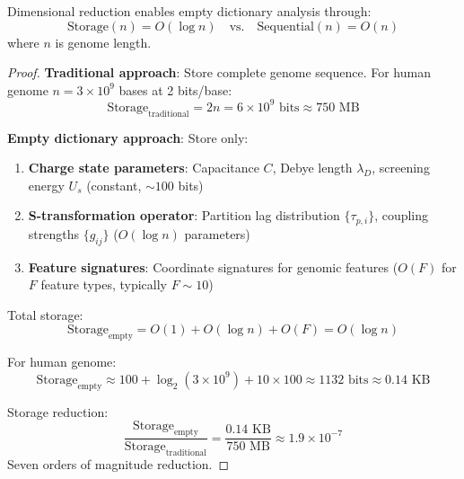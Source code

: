 \begin{theorem}
\label{thm:empty_dictionary_feasibility}
Dimensional reduction enables empty dictionary analysis through:
\begin{equation}
\text{Storage}(n) = O(\log n) \quad \text{vs.} \quad \text{Sequential}(n) = O(n)
\end{equation}
where $n$ is genome length.
\end{theorem}

\begin{proof}
\textbf{Traditional approach}: Store complete genome sequence. For human genome $n = 3 \times 10^9$ bases at 2 bits/base:
\begin{equation}
\text{Storage}_{\text{traditional}} = 2n = 6 \times 10^9 \text{ bits} \approx 750 \text{ MB}
\end{equation}

\textbf{Empty dictionary approach}: Store only:
\begin{enumerate}
\item \textbf{Charge state parameters}: Capacitance $C$, Debye length $\lambda_D$, screening energy $U_s$ (constant, $\sim 100$ bits)
\item \textbf{S-transformation operator}: Partition lag distribution $\{\tau_{p,i}\}$, coupling strengths $\{g_{ij}\}$ ($O(\log n)$ parameters)
\item \textbf{Feature signatures}: Coordinate signatures for genomic features ($O(F)$ for $F$ feature types, typically $F \sim 10$)
\end{enumerate}

Total storage:
\begin{equation}
\text{Storage}_{\text{empty}} = O(1) + O(\log n) + O(F) = O(\log n)
\end{equation}

For human genome:
\begin{equation}
\text{Storage}_{\text{empty}} \approx 100 + \log_2(3 \times 10^9) + 10 \times 100 \approx 1132 \text{ bits} \approx 0.14 \text{ KB}
\end{equation}

Storage reduction:
\begin{equation}
\frac{\text{Storage}_{\text{empty}}}{\text{Storage}_{\text{traditional}}} = \frac{0.14 \text{ KB}}{750 \text{ MB}} \approx 1.9 \times 10^{-7}
\end{equation}
Seven orders of magnitude reduction.
\end{proof}

